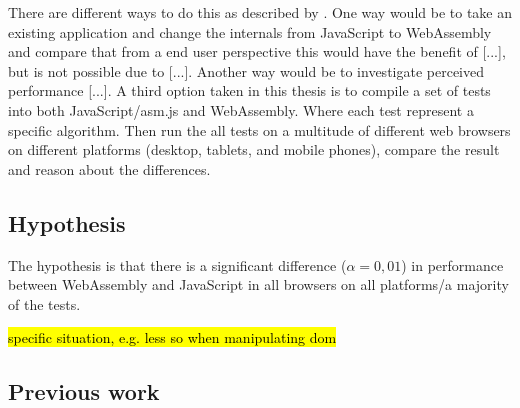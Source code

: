 There are different ways to do this as described by \textcite{WohlinRunesonHostOhlssonRegnellWesslen2012}. One way would be to take an existing application and change the internals from JavaScript to WebAssembly and compare that from a end user perspective this would have the benefit of [...], but is not possible due to [...]. Another way would be to investigate perceived performance [...]. A third option taken in this thesis is to compile a set of tests into both JavaScript/asm.js and WebAssembly. Where each test represent a specific algorithm. Then run the all tests on a multitude of different web browsers on different platforms (desktop, tablets, and mobile phones), compare the result and reason about the differences.





\subsection{Hypothesis}

The hypothesis is that there is a significant difference ($\alpha = 0,01$) in performance between WebAssembly and JavaScript in all browsers on all platforms/a majority of the tests.

\hl{specific situation, e.g. less so when manipulating dom}

\subsection{Previous work}

